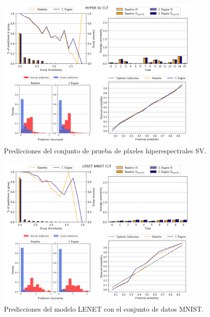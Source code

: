 \begin{figure}[ht]
    \centering
    \includegraphics[width=0.9\textwidth]{root/Imagenes/anexo/CLT-HYPER_SV-mosaic.png}
    \caption{Predicciones del conjunto de prueba de píxeles hiperespectrales SV.}
    \label{fig:anx-CLT-HYPER_SV}
\end{figure}


\begin{figure}[ht]
    \centering
    \includegraphics[width=0.9\textwidth]{root/Imagenes/anexo/CLT-LENET_MNIST-mosaic.png}
    \caption{Predicciones del modelo LENET con el conjunto de datos MNIST.}
    \label{fig:anx-CLT-LENET_MNIST}
\end{figure}


